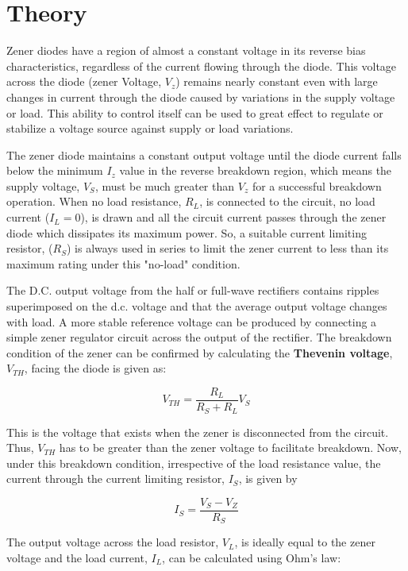 \section{Theory}
Zener diodes have a region of almost a constant voltage in its reverse bias characteristics, regardless of the current flowing through the diode. This voltage across the diode (zener Voltage, $V_z$) remains nearly constant even with large changes in current through the diode caused by variations in the supply voltage or load. This ability to control itself can be used to great effect to regulate or stabilize a voltage source against supply or load variations.

The zener diode maintains a constant output voltage until the diode current falls below the minimum $I_z$ value in the reverse breakdown region, which means the supply voltage, $V_S$, must be much greater than $V_z$ for a successful breakdown operation. When no load resistance, $R_L$, is connected to the circuit, no load current ($I_L = 0$), is drawn and all the circuit current passes through the zener diode which dissipates its maximum power. So, a suitable current limiting resistor, ($R_S$) is always used in series to limit the zener current to less than its maximum rating under this "no-load" condition. 

The D.C. output voltage from the half or full-wave rectifiers contains ripples superimposed on the d.c. voltage and that the average output voltage changes with load. A more stable reference voltage can be produced by connecting a simple zener regulator circuit across the output of the rectifier. The breakdown condition of the zener can be confirmed by calculating the \textbf{Thevenin voltage}, $V_{TH}$, facing the diode is given as: 

\begin{equation}
    V_{TH} = \frac{R_L}{R_S + R_L}V_S
\end{equation}

This is the voltage that exists when the zener is disconnected from the circuit. Thus, $V_{TH}$ has to be greater than the zener voltage to facilitate breakdown. Now, under this breakdown condition, irrespective of the load resistance value, the current through the current limiting resistor, $I_S$, is given by 

\begin{equation}
    I_{S} = \frac{V_S-V_Z}{R_S}
\end{equation}

The output voltage across the load resistor, $V_L$, is ideally equal to the zener voltage and the load current, $I_L$, can be calculated using Ohm’s law:

